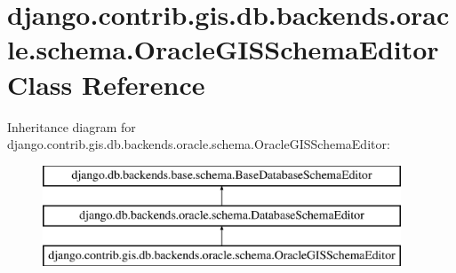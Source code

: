 \hypertarget{classdjango_1_1contrib_1_1gis_1_1db_1_1backends_1_1oracle_1_1schema_1_1_oracle_g_i_s_schema_editor}{}\section{django.\+contrib.\+gis.\+db.\+backends.\+oracle.\+schema.\+Oracle\+G\+I\+S\+Schema\+Editor Class Reference}
\label{classdjango_1_1contrib_1_1gis_1_1db_1_1backends_1_1oracle_1_1schema_1_1_oracle_g_i_s_schema_editor}
Inheritance diagram for django.\+contrib.\+gis.\+db.\+backends.\+oracle.\+schema.\+Oracle\+G\+I\+S\+Schema\+Editor\+:\begin{figure}[H]
\begin{center}
\leavevmode
\includegraphics[height=3.000000cm]{classdjango_1_1contrib_1_1gis_1_1db_1_1backends_1_1oracle_1_1schema_1_1_oracle_g_i_s_schema_editor}
\end{center}
\end{figure}
